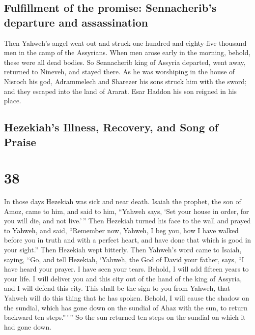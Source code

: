 \hypertarget{fulfillment-of-the-promise-sennacheribs-departure-and-assassination}{%
\subsection{Fulfillment of the promise: Sennacherib's departure and
assassination}\label{fulfillment-of-the-promise-sennacheribs-departure-and-assassination}}

 Then Yahweh's angel went out and struck one hundred and
eighty-five thousand men in the camp of the Assyrians. When men arose
early in the morning, behold, these were all dead bodies.
 So Sennacherib king of Assyria departed, went away,
returned to Nineveh, and stayed there.  As he was
worshiping in the house of Nisroch his god, Adrammelech and Sharezer his
sons struck him with the sword; and they escaped into the land of
Ararat. Esar Haddon his son reigned in his place.

\hypertarget{hezekiahs-illness-recovery-and-song-of-praise}{%
\subsection{Hezekiah's Illness, Recovery, and Song of
Praise}\label{hezekiahs-illness-recovery-and-song-of-praise}}

\hypertarget{section-37}{%
\section{38}\label{section-37}}

 In those days Hezekiah was sick and near death. Isaiah
the prophet, the son of Amoz, came to him, and said to him, ``Yahweh
says, `Set your house in order, for you will die, and not live.'\,''
 Then Hezekiah turned his face to the wall and prayed to
Yahweh,  and said, ``Remember now, Yahweh, I beg you, how
I have walked before you in truth and with a perfect heart, and have
done that which is good in your sight.'' Then Hezekiah wept bitterly.
 Then Yahweh's word came to Isaiah, saying, 
``Go, and tell Hezekiah, `Yahweh, the God of David your father, says,
``I have heard your prayer. I have seen your tears. Behold, I will add
fifteen years to your life.  I will deliver you and this
city out of the hand of the king of Assyria, and I will defend this
city.  This shall be the sign to you from Yahweh, that
Yahweh will do this thing that he has spoken.  Behold, I
will cause the shadow on the sundial, which has gone down on the sundial
of Ahaz with the sun, to return backward ten steps.''\,'\,'' So the sun
returned ten steps on the sundial on which it had gone down.


